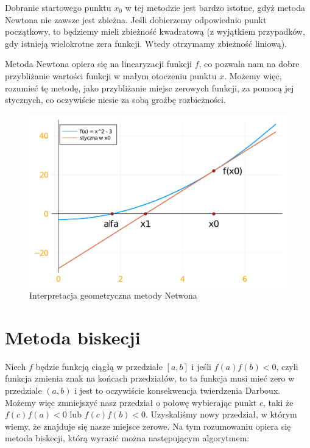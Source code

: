 \documentclass[a4paper]{article}
\begin{document}
    Dobranie startowego punktu $x_0$ w tej metodzie jest bardzo istotne, gdyż metoda Newtona nie zawsze jest zbieżna.
    Jeśli dobierzemy odpowiednio punkt początkowy, to będziemy mieli zbieżność kwadratową (z wyjątkiem przypadków, gdy 
    istnieją wielokrotne zera funkcji. Wtedy otrzymamy zbieżność liniową).

    \vspace{5mm}

    Metoda Newtona opiera się na linearyzacji funkcji $f$, co pozwala nam na dobre przybliżanie wartości funkcji w małym
    otoczeniu punktu $x$. Możemy więc, rozumieć tę metodę, jako przybliżanie miejsc zerowych funkcji, za pomocą jej stycznych,
    co oczywiście niesie za sobą groźbę rozbieżności.

    \vspace{10mm}

    \begin{figure}[h]
        \centering
        \includegraphics[width=13cm]{newtonPlot}
        \caption{Interpretacja geometryczna metody Netwona}
    \end{figure}

\newpage
\section{Metoda biskecji}
    Niech $f$ będzie funkcją ciągłą w przedziale $[a,b]$ i jeśli $f(a)f(b) < 0$, czyli funkcja zmienia znak na końcach przedziałów, to
    ta funkcja musi mieć zero w przedziale $(a,b)$ i jest to oczywiście konsekwencja twierdzenia Darboux. Możemy więc zmniejszyć nasz
    przedział o połowę wybierając punkt $c$, taki że $f(c)f(a) < 0$ lub $f(c)f(b) < 0$. Uzyskaliśmy nowy przedział, w którym wiemy, że
    znajduje się nasze miejsce zerowe. Na tym rozumowaniu opiera się metoda biskecji, którą wyrazić można następującym algorytmem:
\end{document}
